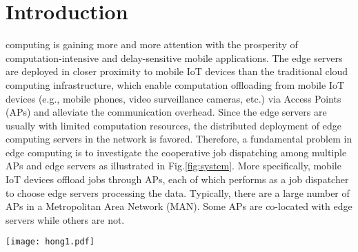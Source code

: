 \section{Introduction}
\label{sec:introduction}
 computing is gaining more and more attention with the prosperity of computation-intensive and delay-sensitive mobile applications.
The edge servers are deployed in closer proximity to mobile IoT devices than the traditional cloud computing infrastructure, which enable computation offloading from mobile IoT devices (e.g., mobile phones, video surveillance cameras, etc.) via Access Points (APs) and alleviate the communication overhead. 
Since the edge servers are usually with limited computation resources, the distributed deployment of edge computing servers in the network is favored.
Therefore, a fundamental problem in edge computing is to investigate the cooperative job dispatching among multiple APs and edge servers as illustrated in Fig.\ref{fig:system}.
More specifically, mobile IoT devices offload jobs through APs, each of which performs as a job dispatcher to choose edge servers processing the data. Typically, there are a large number of APs in a Metropolitan Area Network (MAN). Some APs are co-located with edge servers while others are not.

\begin{figure*}[htp!]
    \centering
    \texttt{[image: hong1.pdf]}
    \caption{The illustration of system model.}
    \label{fig:system}
\end{figure*}

